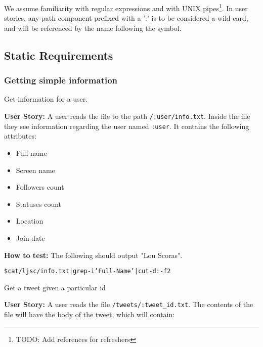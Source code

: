 We assume familiarity with regular expressions and with UNIX
pipes\footnote{TODO: Add references for refreshers}. In user stories, any path
component prefixed with a ':' is to be considered a wild card, and will be
referenced by the name following the symbol.

\subsection{Static Requirements}

\newenvironment{Requirements}
  {\begin{list}{SR-\arabic{requirements}.}%
               {}}%
  {\end{list}}

\begin{Requirements}

\subsubsection{Getting simple information}
\item Get information for a user.

\textbf{User Story:} A user reads the file to the path \texttt{/:user/info.txt}.
Inside the file they see information regarding the user named \texttt{:user}. It
contains the following attributes:

\begin{itemize}
\item Full name
\item Screen name
\item Followers count
\item Statuses count
\item Location
\item Join date
\end{itemize}

\textbf{How to test:} The following should output "Lou Scoras".

\begin{alltt}
    \$ cat /ljsc/info.txt | grep -i 'Full-Name' | cut -d: -f2 
\end{alltt}

\item Get a tweet given a particular id\label{req:get-a-tweet}

\textbf{User Story:} A user reads the file \texttt{/tweets/:tweet\_id.txt}.
The contents of the file will have the body of the tweet, which will contain:


\end{Requirements}
